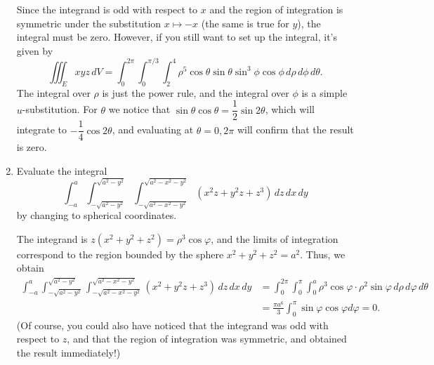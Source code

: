 \documentclass[letterpaper,12pt]{article}
\newcommand{\di}{\displaystyle}
\begin{document}
\begin{enumerate}
\bigskip

Since the integrand is odd with respect to $x$ and the region of integration is symmetric under the substitution $x\mapsto -x$ (the same is true for $y$), the integral must be zero. However, if you still want to set up the integral, it's given by
\[
 \iiint_E xyz\, dV = \int_0^{2\pi}\int_0^{\pi/3}\int_2^4\rho^5\cos\theta\sin\theta\sin^3\phi\cos\phi\,d\rho\,d\phi\,d\theta.
\]
The integral over $\rho$ is just the power rule, and the integral over $\phi$ is a simple $u$-substitution. For $\theta$ we notice that $\sin\theta\cos\theta = \dfrac{1}{2}\sin 2\theta$, which will integrate to $-\dfrac{1}{4}\cos 2\theta$, and evaluating at $\theta = 0,2\pi$ will confirm that the result is zero.

\bigskip


\item  Evaluate the integral 
\[
\di \int_{-a}^a\int_{-\sqrt{a^2-y^2}}^{\sqrt{a^2-y^2}}\int_{-\sqrt{a^2-x^2-y^2}}^{\sqrt{a^2-x^2-y^2}}(x^2z+y^2z+z^3)\, dz\,dx\,dy
\]
by changing to spherical coordinates.


\bigskip

The integrand is $z(x^2+y^2+z^2) = \rho^3\cos\varphi$, and the limits of integration correspond to the region bounded by the sphere $x^2+y^2+z^2=a^2$. Thus, we obtain
\begin{align*}
\int_{-a}^a\int_{-\sqrt{a^2-y^2}}^{\sqrt{a^2-y^2}}\int_{-\sqrt{a^2-x^2-y^2}}^{\sqrt{a^2-x^2-y^2}}(x^2+y^2z+z^3)\, dz\,dx\,dy & = \int_0^{2\pi}\int_0^{\pi}\int_0^a \rho^3\cos\varphi\cdot \rho^2\sin\varphi \,d\rho\, d\varphi\, d\theta\\
& = \frac{\pi a^6}{3}\int_0^{\pi}\sin\varphi\cos\varphi d\varphi = 0.
\end{align*}
(Of course, you could also have noticed that the integrand was odd with respect to $z$, and that the region of integration was symmetric, and obtained the result immediately!)


\end{enumerate}
\end{document}
